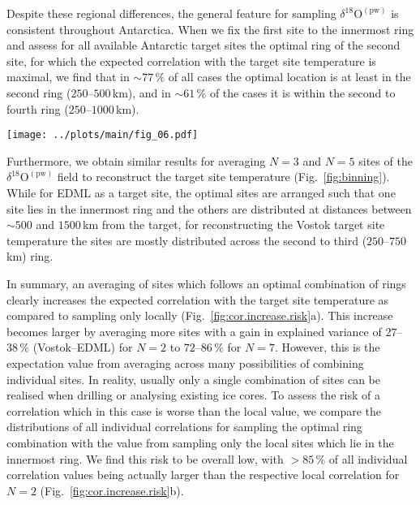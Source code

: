 \documentclass[cp, manuscript]{copernicus}
\begin{document}
Despite these regional differences, the general feature for sampling
$\delta^{18}\mathrm{O}^{\mathrm{(pw)}}$ is consistent throughout
Antarctica. When we fix the first site to the innermost ring and assess for all
available Antarctic target sites the optimal ring of the second site, for which
the expected correlation with the target site temperature is maximal, we find
that in $\sim77\,\%$ of all cases the optimal location is at least in the second
ring ($250$--$500$\,km), and in $\sim61\,\%$ of the cases it is within the
second to fourth ring ($250$--$1000$\,km).

\begin{figure*}[t]%
\centering
\texttt{[image: ../plots/main/fig\_06.pdf]}
\caption{%
  The optimal arrangement for averaging three or five
  $\delta^{18}\mathrm{O}^{\mathrm{(pw)}}$ ice cores to reconstruct the target
  site temperature at the EDML (\textbf{a}, \textbf{c}) and Vostok (\textbf{b},
  \textbf{d}) drilling sites. Displayed are the optimal five of all possible
  combinations of rings, i.e. those which exhibit the highest mean
  correlation across $10^5$ random trials of averaging $N=3$ (\textbf{c},
  \textbf{d}) or $N=5$ (\textbf{a}, \textbf{b}) grid cells from these rings.}
\label{fig:binning}%
\end{figure*}%

Furthermore, we obtain similar results for averaging $N=3$ and $N=5$ sites of
the $\delta^{18}\mathrm{O}^{\mathrm{(pw)}}$ field to reconstruct the target site
temperature (Fig.~\ref{fig:binning}). While for EDML as a target site, the
optimal sites are arranged such that one site lies in the innermost ring and the
others are distributed at distances between $\sim500$ and $1500$\,km from the
target, for reconstructing the Vostok target site temperature the sites are
mostly distributed across the second to third ($250$--$750$\,km) ring.

In summary, an averaging of sites which follows an optimal combination of
rings clearly increases the expected correlation with the target site
temperature as compared to sampling only locally
(Fig.~\ref{fig:cor.increase.risk}a). This increase becomes larger by averaging
more sites with a gain in explained variance of $27$--$38\,\%$ (Vostok--EDML)
for $N=2$ to $72$--$86\,\%$ for $N=7$. However, this is the expectation value
from averaging across many possibilities of combining individual sites. In
reality, usually only a single combination of sites can be realised when
drilling or analysing existing ice cores. To assess the risk of a correlation
which in this case is worse than the local value, we compare the distributions
of all individual correlations for sampling the optimal ring combination with
the value from sampling only the local sites which lie in the innermost ring. We
find this risk to be overall low, with $>85\,\%$ of all individual correlation
values being actually larger than the respective local correlation for $N=2$
(Fig.~\ref{fig:cor.increase.risk}b).
\end{document}
